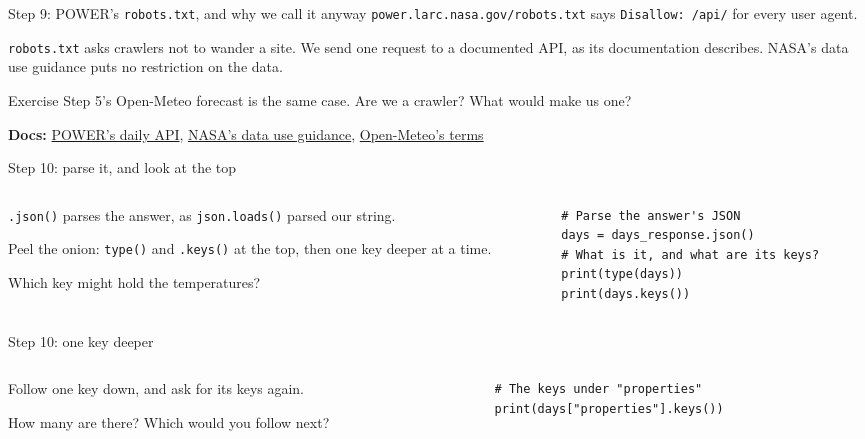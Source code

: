 \documentclass[9pt,aspectratio=169]{beamer}
\begin{document}
\begin{frame}{Step 9: POWER's \texttt{robots.txt}, and why we call it anyway}
    \texttt{power.larc.nasa.gov/robots.txt} says \texttt{Disallow: /api/} for every user agent.

    \medskip
    \texttt{robots.txt} asks crawlers not to wander a site. We send one request to a documented API, as its documentation describes. NASA's data use guidance puts no restriction on the data.

    \medskip
    Exercise Step 5's Open-Meteo forecast is the same case. Are we a crawler? What would make us one?

    \medskip
    {\scriptsize\textbf{Docs:} \href{https://power.larc.nasa.gov/docs/services/api/temporal/daily/}{POWER's daily API}, \href{https://www.earthdata.nasa.gov/engage/open-data-services-software-policies/data-use-guidance}{NASA's data use guidance}, \href{https://open-meteo.com/en/terms}{Open-Meteo's terms}\par}
\end{frame}

\begin{frame}[fragile]{Step 10: parse it, and look at the top}
    \begin{columns}[T]
        \begin{column}{0.37\textwidth}
            \texttt{.json()} parses the answer, as \texttt{json.loads()} parsed our string.

            \medskip
            Peel the onion: \texttt{type()} and \texttt{.keys()} at the top, then one key deeper at a time.

            \medskip
            Which key might hold the temperatures?
        \end{column}
        \begin{column}{0.6\textwidth}
\begin{lstlisting}
# Parse the answer's JSON
days = days_response.json()
# What is it, and what are its keys?
print(type(days))
print(days.keys())
\end{lstlisting}
        \end{column}
    \end{columns}
\end{frame}

\begin{frame}[fragile]{Step 10: one key deeper}
    \begin{columns}[T]
        \begin{column}{0.37\textwidth}
            Follow one key down, and ask for its keys again.

            \medskip
            How many are there? Which would you follow next?
        \end{column}
        \begin{column}{0.6\textwidth}
\begin{lstlisting}
# The keys under "properties"
print(days["properties"].keys())
\end{lstlisting}
        \end{column}
    \end{columns}
\end{frame}
\end{document}
